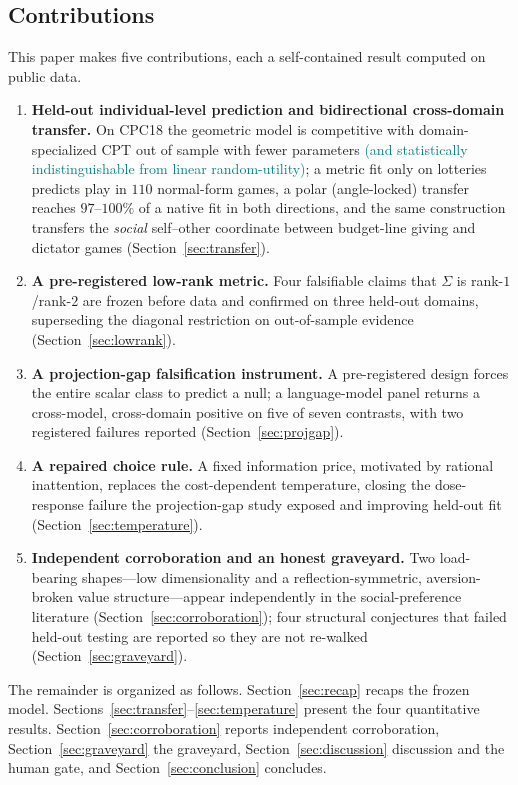 \documentclass[journal]{IEEEtran}
\newcommand{\rev}[1]{\textcolor{teal}{#1}}
\begin{document}
\subsection{Contributions}
This paper makes five contributions, each a self-contained result computed on public data.
\begin{enumerate}
    \item \textbf{Held-out individual-level prediction and bidirectional cross-domain transfer.} On CPC18 the geometric model is competitive with domain-specialized CPT out of sample with fewer parameters\rev{ (and statistically indistinguishable from linear random-utility)}; a metric fit only on lotteries predicts play in $110$ normal-form games, a polar (angle-locked) transfer reaches $97$--$100\%$ of a native fit in both directions, and the same construction transfers the \emph{social} self--other coordinate between budget-line giving and dictator games (Section~\ref{sec:transfer}).
    \item \textbf{A pre-registered low-rank metric.} Four falsifiable claims that $\Sigma$ is rank-$1$/rank-$2$ are frozen before data and confirmed on three held-out domains, superseding the diagonal restriction on out-of-sample evidence (Section~\ref{sec:lowrank}).
    \item \textbf{A projection-gap falsification instrument.} A pre-registered design forces the entire scalar class to predict a null; a language-model panel returns a cross-model, cross-domain positive on five of seven contrasts, with two registered failures reported (Section~\ref{sec:projgap}).
    \item \textbf{A repaired choice rule.} A fixed information price, motivated by rational inattention, replaces the cost-dependent temperature, closing the dose-response failure the projection-gap study exposed and improving held-out fit (Section~\ref{sec:temperature}).
    \item \textbf{Independent corroboration and an honest graveyard.} Two load-bearing shapes---low dimensionality and a reflection-symmetric, aversion-broken value structure---appear independently in the social-preference literature (Section~\ref{sec:corroboration}); four structural conjectures that failed held-out testing are reported so they are not re-walked (Section~\ref{sec:graveyard}).
\end{enumerate}

The remainder is organized as follows.
Section~\ref{sec:recap} recaps the frozen model.
Sections~\ref{sec:transfer}--\ref{sec:temperature} present the four quantitative results.
Section~\ref{sec:corroboration} reports independent corroboration, Section~\ref{sec:graveyard} the graveyard, Section~\ref{sec:discussion} discussion and the human gate, and Section~\ref{sec:conclusion} concludes.
\end{document}
